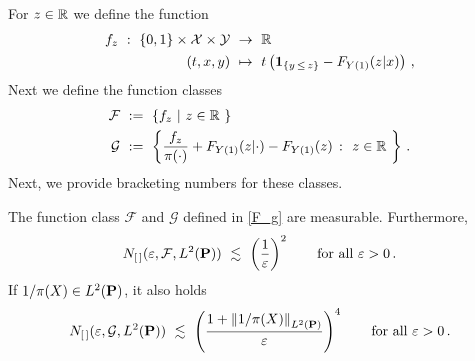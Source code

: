 For $z\in\R$ we define the function
  \begin{align*}
    f_z
    \ 
    :
    \ 
      \left\{ 0,1 \right\}
      \times
      \mathcal{X}
      \times
      \mathcal{Y}
    &
    \ 
    \to
    \ 
    \R
    \\
      (t,x,y)
    &
      \ 
      \mapsto
      \ 
      t
      \left( 
        \mathbf{1}
        _{\left\{  y\,\le\,z \right\}}
        -
        F_{Y(1)}(z|x)
      \right)
      \,,
  \end{align*}
    Next we define the function classes
  \begin{gather}
    \label{F_g}
    \begin{split}
    \mathcal{F}
    &
    \ 
    :=
    \ 
    \left\{ 
      f_z
      \ 
      |
      \ 
      z\in\R\ 
    \right\}
    \\
    \mathcal{G}
    &
    \ 
    :=
    \ 
    \left\{ 
      \frac{f_z}{\pi(\cdot)}
      +
      F_{Y(1)}(z|\cdot)
      -
      F_{Y(1)}(z)
      \ 
      \colon
      \ 
      z\in\R\ 
    \right\}
    \,.
    \end{split}
  \end{gather}
Next, we provide bracketing numbers for these classes.
\begin{lemma}
  \label{aa:mean:l:br}
  The function class $\mathcal{F}$ and $\mathcal{G}$ defined in \eqref{F_g} are measurable.
  Furthermore, 
  \begin{gather*}
    N_{[\,]}
    (
    \varepsilon
    ,
    \mathcal{F}, L^2(\P))
    \ 
    \lesssim
    \ 
    \left( 
      \frac{1}{\varepsilon}
    \right)^2
    \qquad
    \text{for all}
    \ 
    \varepsilon>0
    \,.
  \end{gather*}
  If $1/\pi(X)\in L^2(\P)$, it also holds 
  \begin{gather*}
    N_{[\,]}
    (
    \varepsilon
    ,
    \mathcal{G}, L^2(\P))
    \ 
    \lesssim
    \ 
    \left( 
    \frac{
      1+
    \norm{1/\pi(X)}_{ L^2(\P)}
    }
    {\varepsilon}
    \right)^4
    \qquad
    \text{for all}
    \ 
    \varepsilon>0
    \,.
  \end{gather*}
\end{lemma}
